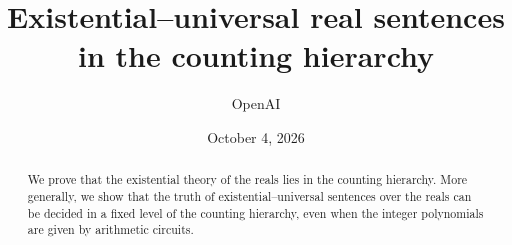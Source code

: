 \documentclass[11pt]{article}
\title{Existential--universal real sentences\\in the counting hierarchy}
\author{OpenAI}
\date{October 4, 2026}
\begin{document}
\maketitle
\begin{abstract}
We prove that the existential theory of the reals lies in the counting
hierarchy. More generally, we show that the truth of existential--universal
sentences over the reals can be decided in a fixed level of the counting
hierarchy, even when the integer polynomials are given by arithmetic circuits.
\end{abstract}
\setcounter{tocdepth}{1}
\hypersetup{bookmarksdepth=2}
\begingroup\small\tableofcontents\endgroup
\clearpage






\appendix


\begingroup\raggedright{}

\endgroup
\end{document}

